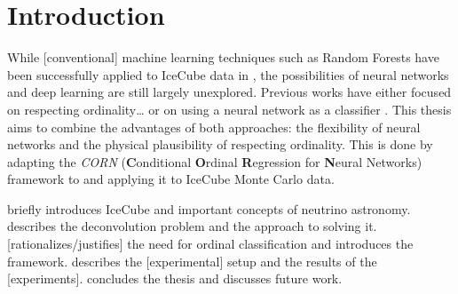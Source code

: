 \chapter{Introduction}
While [conventional] machine learning techniques
  such as Random Forests
have been successfully applied to IceCube data in \dsea{},
the possibilities of neural networks and deep learning are still largely unexplored. %
%
Previous works have either
  focused on respecting ordinality… \cite{dsea_jan}
  or on using a neural network as a classifier \cite{dsea_samuel}.
This thesis aims to combine the advantages of both approaches:
  the flexibility of neural networks
  and the physical plausibility of respecting ordinality.
This is done by adapting the
\emph{CORN} (\textbf{C}onditional \textbf{O}rdinal \textbf{R}egression for \textbf{N}eural Networks) \cite{corn} framework
to \dsea{}
and applying it to IceCube Monte Carlo data.

 briefly introduces IceCube and important concepts of neutrino astronomy.
 describes the deconvolution problem and the \dsea{} approach to solving it.
 [rationalizes/justifies] the need for ordinal classification and introduces the \corn{} framework.
 describes the [experimental] setup and the results of the [experiments].
 concludes the thesis and discusses future work.

\blindtext[2]
